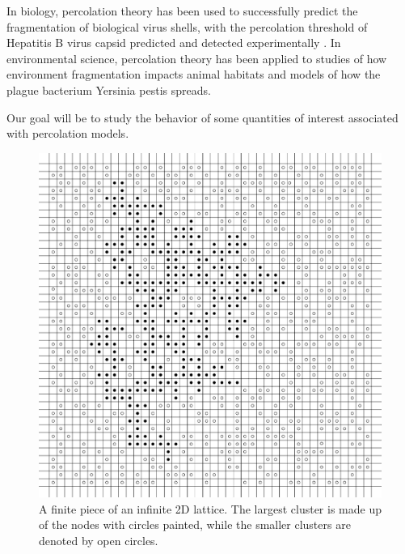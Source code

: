 In biology, percolation theory has been used to successfully predict the fragmentation of biological virus shells\cite{Brunk_2018}, with the percolation threshold of Hepatitis B virus capsid predicted and detected experimentally \cite{doi:10.1002/pro.3265}. In environmental science, percolation theory has been applied to studies of how environment fragmentation impacts animal habitats\cite{Boswell} and models of how the plague bacterium Yersinia pestis spreads\cite{Davis}.


Our goal will be to study the behavior of some quantities of interest associated with percolation models.

\begin{figure}[H]
  \includegraphics[width=\linewidth]{Images/2dlattice.png}
  \caption{A finite piece of an infinite 2D lattice. The largest cluster is made up of the nodes with circles painted, while the smaller clusters are denoted by open circles.}
  \label{fig:2dlattice}
\end{figure}


